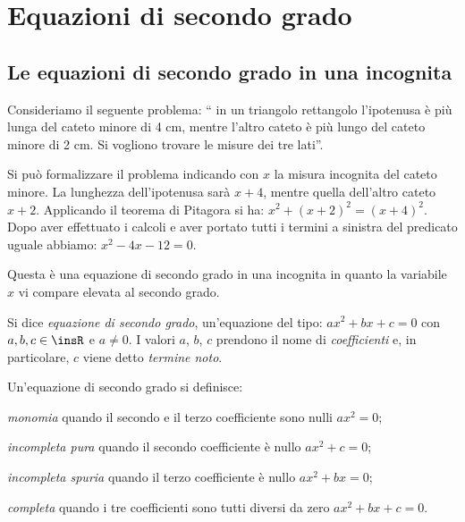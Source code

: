 \chapter{Equazioni di secondo grado}
\section{Le equazioni di secondo grado in una incognita}

Consideriamo il seguente problema: “ in un triangolo rettangolo l'ipotenusa è più lunga del cateto minore di 4 cm, mentre l'altro cateto è più lungo del cateto minore di 2 cm. Si vogliono trovare le misure dei tre lati”.

Si può formalizzare il problema indicando con $x$ la misura incognita del cateto minore. La lunghezza dell'ipotenusa sarà $x + 4$, mentre quella dell'altro cateto $x + 2$. Applicando il teorema di Pitagora si ha: $x ^{2 } + ( x + 2 ) ^{2 } = ( x + 4 ) ^{2 }$. Dopo aver effettuato i calcoli e aver portato tutti i termini a sinistra del predicato uguale abbiamo: $x ^{2}-4x-12=0$.
\begin{center}

\end{center}
Questa è una equazione di secondo grado in una incognita in quanto la variabile $x$ vi compare elevata al secondo grado.
\begin{definizione}
Si dice \emph{equazione di secondo grado}, un’equazione del tipo: $a x ^{2 } + b x + c = 0$ con $a, b, c \in \insR$ e $a \neq 0$. I valori $a$, $b$, $c$ prendono il nome di \emph{coefficienti} e, in particolare, $c$ viene detto \emph{termine noto}.
\end{definizione}

Un’equazione di secondo grado si definisce:
\begin{description*}
 \item \emph{monomia} quando il secondo e il terzo coefficiente sono nulli $a x ^{2}=0$;
 \item \emph{incompleta pura} quando il secondo coefficiente è nullo $a x ^{2 } + c = 0$;
 \item \emph{incompleta spuria} quando il terzo coefficiente è nullo $a x ^{2 } + b x = 0$;
 \item \emph{completa} quando i tre coefficienti sono tutti diversi da zero $a x ^{2 } + b x + c = 0$.
\end{description*}

